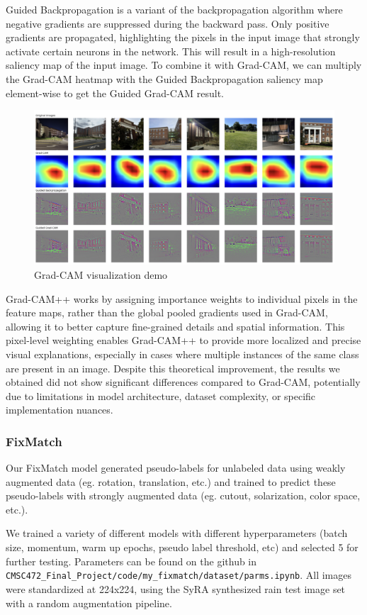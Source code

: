 \documentclass{article}
\begin{document}
Guided Backpropagation is a variant of the backpropagation algorithm where negative gradients are suppressed during the backward pass. Only positive gradients are propagated, highlighting the pixels in the input image that strongly activate certain neurons in the network. This will result in a high-resolution saliency map of the input image. To combine it with Grad-CAM, we can multiply the Grad-CAM heatmap with the Guided Backpropagation saliency map element-wise to get the Guided Grad-CAM result.  

\begin{figure}[H]
    \centering
    \includegraphics[width=0.8\linewidth]{gradcam_demo.png}
    \caption{Grad-CAM visualization demo}
    \label{fig:gradcam_demo}
\end{figure}
Grad-CAM++ works by assigning importance weights to individual pixels in the feature maps, rather than the global pooled gradients used in Grad-CAM, allowing it to better capture fine-grained details and spatial information. This pixel-level weighting enables Grad-CAM++ to provide more localized and precise visual explanations, especially in cases where multiple instances of the same class are present in an image. Despite this theoretical improvement, the results we obtained did not show significant differences compared to Grad-CAM, potentially due to limitations in model architecture, dataset complexity, or specific implementation nuances.

\subsubsection{FixMatch}

Our FixMatch model generated pseudo-labels for unlabeled data using weakly augmented data (eg. rotation, translation, etc.) and trained to predict these pseudo-labels with strongly augmented data (eg. cutout, solarization, color space, etc.).

We trained a variety of different models with different hyperparameters (batch size, momentum, warm up epochs, pseudo label threshold, etc) and selected 5 for further testing. Parameters can be found on the github in \verb*|CMSC472_Final_Project/code/my_fixmatch/dataset/parms.ipynb|. All images were standardized at 224x224, using the SyRA synthesized rain test image set with a random augmentation pipeline. 
\end{document}
